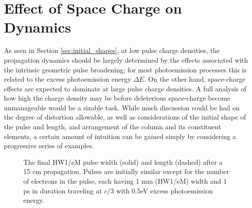 
\section{Effect of Space Charge on Dynamics} \label{sec:free_spacecharge}

As seen in Section \ref{sec:initial_shapes}, at low pulse charge densities, the propagation dynamics should be largely determined by the effects associated with the intrinsic geometric pulse broadening; for most photoemission processes this is related to the excess photoemission energy $\Delta E$.
On the other hand, space-charge effects are expected to dominate at large pulse charge densities.
A full analysis of how high the charge density may be before deleterious space-charge become unmanageable would be a sizable task.
While much discussion could be had on the degree of distortion allowable, as well as considerations of the initial shape of the pulse and length, and arrangement of the column and its constituent elements, a certain amount of intuition can be gained simply by considering a progressive series of examples.

\begin{figure}
  \centering
  \begin{tikzpicture}
    
  \end{tikzpicture}
  \caption[Idealistic free-space pulse evolution vs charge density]{
    The final HW1/eM pulse width (solid) and length (dashed) after a 15 cm propagation. 
    Pulses are initially similar except for the number of electrons in the pulse, each having 1 mm (HW1/eM) width and 1 ps in duration traveling at $c/3$ with 0.5eV excess photoemission energy.
  }
  \label{fig:spacecharge_noacc}
\end{figure}

